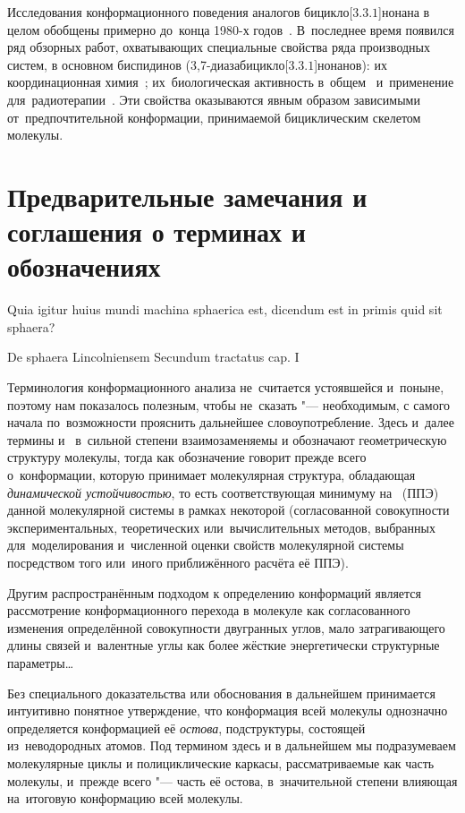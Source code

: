 Исследования конформационного поведения аналогов бицикло[$3.3.1$]\-нонана в целом обобщены примерно до~конца 1980-х годов~\cite{Zefirov:1991a}. В~последнее время появился ряд обзорных работ, охватывающих специальные свойства ряда производных систем, в основном биспидинов (3,7-диазабицикло[$3.3.1$]нонанов): их координационная химия~\cite{Comba:2007}; их~биологическая активность в~общем~\cite{Tomassoli:2016} и~применение для~радиотерапии~\cite{Comba:2018}. Эти свойства оказываются явным образом зависимыми от~предпочтительной конформации, принимаемой бициклическим скелетом молекулы.

\section{Предварительные замечания и соглашения о терминах и обозначениях}

\epigraph{Quia igitur huius mundi machina sphaerica est, dicendum est in primis quid sit sphaera?}{De sphaera Lincolniensem Secundum tractatus cap. I}

Терминология конформационного анализа не~считается устоявшейся и~поныне, поэтому нам показалось полезным, чтобы не~сказать "--- необходимым, с самого начала по~возможности прояснить дальнейшее словоупотребление. Здесь и~далее термины  и~ в~сильной степени взаимозаменяемы и обозначают геометрическую структуру молекулы, тогда как обозначение  говорит прежде всего о~конформации, которую принимает молекулярная структура, обладающая \emph{динамической устойчивостью}, то есть соответствующая минимуму на~ (ППЭ) данной молекулярной системы в рамках некоторой  (согласованной совокупности экспериментальных, теоретических или~вычислительных методов, выбранных для~моделирования и~численной оценки свойств молекулярной системы посредством того или~иного приближённого расчёта её ППЭ).

Другим распространённым подходом к определению конформаций является рассмотрение конформационного перехода в молекуле как согласованного изменения определённой совокупности двугранных углов, мало затрагивающего длины связей и~валентные углы как более жёсткие энергетически структурные параметры\dots

Без специального доказательства или обоснования в дальнейшем принимается интуитивно понятное утверждение, что конформация всей молекулы однозначно определяется конформацией её \emph{остова}, подструктуры, состоящей из~неводородных атомов.
Под термином  здесь и в дальнейшем мы подразумеваем молекулярные циклы и полициклические каркасы, рассматриваемые как часть молекулы, и~прежде всего "--- часть её остова, в~значительной степени влияющая на~итоговую конформацию всей молекулы.

